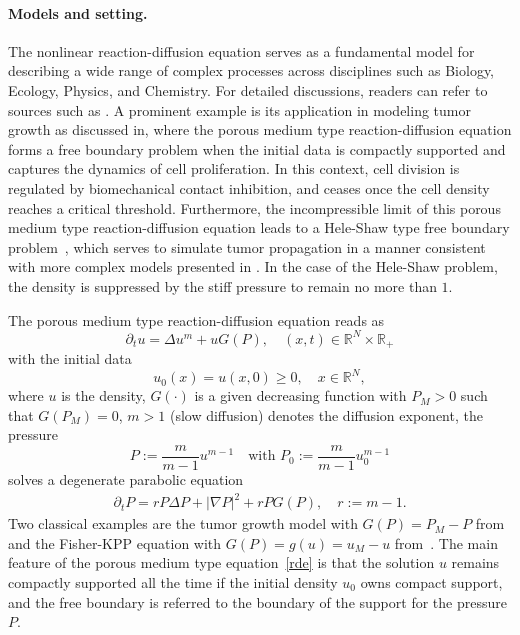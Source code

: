 \documentclass[10pt]{article}         %
\numberwithin{equation}{section}
\begin{document}
\paragraph{Models and setting.}
The nonlinear reaction-diffusion equation serves as a fundamental model for describing a wide range of complex processes across disciplines such as Biology, Ecology, Physics, and Chemistry. For detailed discussions, readers can refer to sources such as \cite{BD2009, CD2017B, FKA1937, PERTHAME2014, WTP1997}. A prominent example is its application in modeling tumor growth as discussed in\cite{BD2009,PERTHAME2014}, where the porous medium type reaction-diffusion equation forms a free boundary problem when the initial data is compactly supported and captures the dynamics of cell proliferation. In this context, cell division is regulated by biomechanical contact inhibition, and ceases once the cell density reaches a critical threshold. Furthermore, the incompressible limit of this porous medium type reaction-diffusion equation leads to a Hele-Shaw type free boundary problem~\cite{PERTHAME2014,DAVID2021,DN2023}, which serves to simulate tumor propagation in a manner consistent with more complex models presented in \cite{BCGS2010, LFJC2010}. In the case of the Hele-Shaw problem, the density is suppressed by the stiff pressure to remain no more than $1$. 

\vspace{2mm}

The porous medium type reaction-diffusion equation reads as 
\begin{equation}\label{rde}
   \partial_t u=\Delta u^m+uG(P),\quad (x,t)\in\mathbb{R}^N\times \mathbb{R}_+
\end{equation}
with the initial data
\[u_0(x)=u(x,0)\geq0,\quad x\in\mathbb{R}^N,\]
where $u$ is the density,  $G(\cdot)$ is a given decreasing function with $P_M>0$ such that $G(P_M)=0$, $m>1$ (slow diffusion) denotes the diffusion exponent, the pressure \begin{equation}\label{pressure}
P:=\frac{m}{m-1}u^{m-1}\quad\text{with } P_0:=\frac{m}{m-1}u_0^{m-1} 
\end{equation} solves a degenerate parabolic equation 
\begin{equation}\label{pe}
\begin{aligned}
\partial_t P=rP\Delta P+|\nabla P|^2+rPG(P),\quad r:=m-1.
\end{aligned}
\end{equation}
Two classical examples are  the tumor growth model with $G(P)=P_M-P$ from~\cite{PERTHAME2014} and the Fisher-KPP equation with $G(P)=g(u)=u_M-u$ from~\cite{DQZ2020}.
 The main feature of the porous medium type equation~\eqref{rde} is that the solution $u$ remains compactly supported all the time if the initial density $u_0$ owns compact support, and the free boundary is referred to the boundary of the support for the pressure $P$.
\vspace{2mm}
\end{document}
